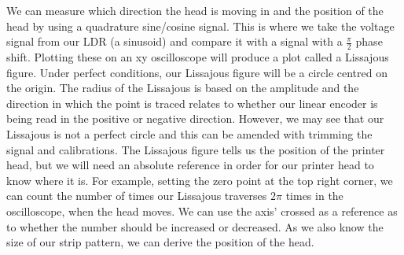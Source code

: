 \documentclass[11pt]{article}
\numberwithin{equation}{section}
\begin{document}
We can measure which direction the head is moving in and the position of the head by using a quadrature sine/cosine signal. This is where we take the voltage signal from our LDR (a sinusoid) and compare it with a signal with a $\frac{\pi}{2}$ phase shift. Plotting these on an xy oscilloscope will produce a plot called a Lissajous figure. Under perfect conditions, our Lissajous figure will be a circle centred on the origin. The radius of the Lissajous is based on the amplitude and the direction in which the point is traced relates to whether our linear encoder is being read in the positive or negative direction. However, we may see that our Lissajous is not a perfect circle and this can be amended with trimming the signal and calibrations. The Lissajous figure tells us the position of the printer head, but we will need an absolute reference in order for our printer head to know where it is. For example, setting the zero point at the top right corner, we can count the number of times our Lissajous traverses $2\pi$ times in the oscilloscope, when the head moves. We can use the axis' crossed as a reference as to whether the number should be increased or decreased. As we also know the size of our strip pattern, we can derive the position of the head.
\end{document}
